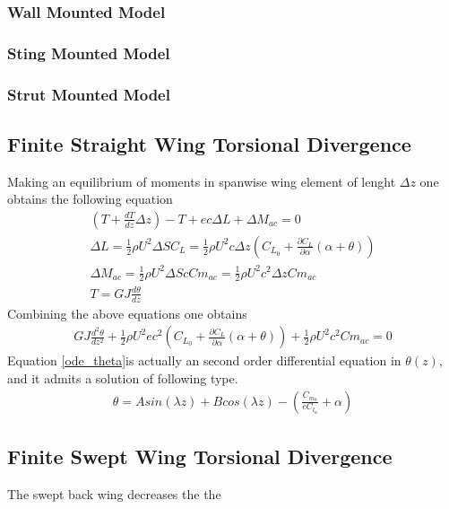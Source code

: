  \subsubsection{Wall Mounted Model}
 
 \subsubsection{Sting Mounted Model}

 \subsubsection{Strut Mounted Model}

 \subsection{Finite Straight Wing Torsional Divergence}
 Making an equilibrium of moments in spanwise wing element of lenght $\Delta z$ one obtains the following equation
 \begin{align}
 \left( T+\frac{d T}{d z}\Delta z \right)-T +ec\Delta L + \Delta M_{ac}=0\\
 \Delta L= \frac{1}{2} \rho U^2 \Delta S C_L = \frac{1}{2} \rho U^2 c \Delta z \left( C_{L_0} + \frac{\partial C_L}{\partial \alpha}(\alpha + \theta) \right)\\
 \Delta M_{ac}= \frac{1}{2} \rho U^2 \Delta S c Cm_{ac} = \frac{1}{2} \rho U^2 c^2 \Delta z Cm_{ac}\\
 T=GJ \frac{d \theta}{dz}
 \end{align}
 Combining the above equations one obtains
 \begin{align}
 GJ\frac{d^2 \theta}{dz^2} + \frac{1}{2} \rho U^2 ec^2 \left( C_{L_0} + \frac{\partial C_L}{\partial \alpha}(\alpha + \theta) \right) + \frac{1}{2} \rho U^2 c^2 Cm_{ac}=0 \label{ode_theta}
 \end{align}
 Equation \eqref{ode_theta}is actually an second order differential equation in $\theta(z)$, and it admits a solution of following type.
 \begin{align}
 \theta= A sin(\lambda z) + B cos(\lambda z) - \left(\frac{C_{m_0}}{e C_{l_\alpha}} + \alpha \right)
 \end{align}




 \subsection{Finite Swept Wing Torsional Divergence}
 The swept back wing decreases the the 


